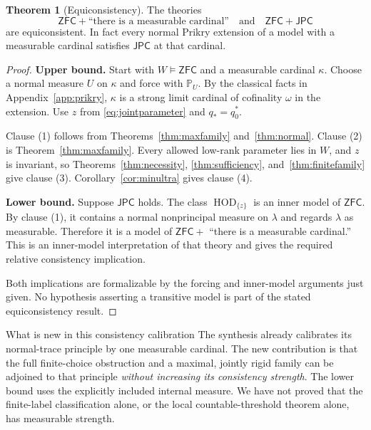 \documentclass[11pt,letterpaper]{article}
\theoremstyle{definition}
\newtheorem{theorem}[definition]{Theorem}
\numberwithin{equation}{section}
\newcommand{\ZFC}{\mathsf{ZFC}}
\newcommand{\HD}[1]{\operatorname{HOD}_{\{#1\}}}
\begin{document}
\begin{theorem}[Equiconsistency]\label{thm:equiconsistency}
The theories
\[
 \ZFC+\text{``there is a measurable cardinal''}
 \quad\text{and}\quad
 \ZFC+\mathsf{JPC}
\]
are equiconsistent. In fact every normal Prikry extension of a model with a measurable cardinal satisfies $\mathsf{JPC}$ at that cardinal.
\end{theorem}
\begin{proof}
\textbf{Upper bound.}
Start with $W\models\ZFC$ and a measurable cardinal $\kappa$. Choose a normal measure $U$ on $\kappa$ and force with $\mathbb P_U$. By the classical facts in Appendix~\ref{app:prikry}, $\kappa$ is a strong limit cardinal of cofinality $\omega$ in the extension. Use $z$ from \eqref{eq:jointparameter} and $q_*=q_0^*$.

Clause (1) follows from Theorems~\ref{thm:maxfamily} and~\ref{thm:normal}. Clause (2) is Theorem~\ref{thm:maxfamily}. Every allowed low-rank parameter lies in $W$, and $z$ is invariant, so Theorems~\ref{thm:necessity}, \ref{thm:sufficiency}, and~\ref{thm:finitefamily} give clause (3). Corollary~\ref{cor:minultra} gives clause (4).

\textbf{Lower bound.}
Suppose $\mathsf{JPC}$ holds. The class $\HD{z}$ is an inner model of $\ZFC$. By clause (1), it contains a normal nonprincipal measure on $\lambda$ and regards $\lambda$ as measurable. Therefore it is a model of $\ZFC+$ ``there is a measurable cardinal.'' This is an inner-model interpretation of that theory and gives the required relative consistency implication.

Both implications are formalizable by the forcing and inner-model arguments just given. No hypothesis asserting a transitive model is part of the stated equiconsistency result.
\end{proof}

\begin{assessment}{What is new in this consistency calibration}
The synthesis already calibrates its normal-trace principle by one measurable cardinal. The new contribution is that the full finite-choice obstruction and a maximal, jointly rigid family can be adjoined to that principle \emph{without increasing its consistency strength}. The lower bound uses the explicitly included internal measure. We have not proved that the finite-label classification alone, or the local countable-threshold theorem alone, has measurable strength.
\end{assessment}
\end{document}

